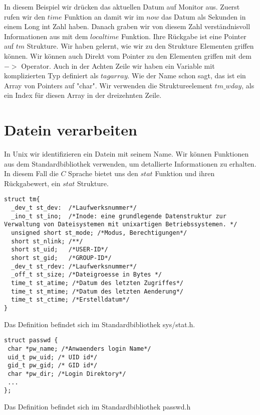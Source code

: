 \documentclass{article}[12pt]
\newenvironment{myexampleblock}[1]{%
    \tcolorbox[beamer,%
    noparskip,breakable,
    colback=White,colframe=ForestGreen,%
    colbacklower=LimeGreen!75!White,%
    title=#1]}%
    {\endtcolorbox}
\begin{document}
In diesem Beispiel wir drücken das aktuellen Datum auf Monitor aus. Zuerst rufen wir den $time$ Funktion
an damit wir  im $now$ das Datum als Sekunden in einem Long int Zahl haben. Danach graben wir von diesem Zahl 
verständnisvoll Informationen aus mit dem $localtime$ Funktion. Ihre Rückgabe ist eine Pointer auf $tm$ Strukture. 
Wir haben gelernt, wie wir zu den Strukture Elementen griffen können. Wir können auch Direkt vom Pointer
zu den Elementen griffen mit dem $->$ Operator. Auch in der Achten Zeile wir haben ein Variable mit komplizierten
Typ definiert als $tagarray$. Wie der Name schon sagt, das ist ein Array von Pointers auf "char". Wir verwenden
die Struktureelement $tm\_wday$, als ein Index für diesen Array in der dreizehnten Zeile.
\section{Datein verarbeiten}
In Unix wir identifizieren ein Datein mit seinem Name. Wir können Funktionen aus dem Standardbibliothek verwenden, um
detallierte Informationen zu erhalten. In diesem Fall die $C$ Sprache bietet uns den $stat$ Funktion und ihren Rückgabewert,
ein $stat$ Strukture. 
\begin{myexampleblock}{Definition: \texttt{struct stat}}
\begin{lstlisting}
struct tm{
  _dev_t st_dev:  /*Laufwerksnummer*/
  _ino_t st_ino;  /*Inode: eine grundlegende Datenstruktur zur Verwaltung von Dateisystemen mit unixartigen Betriebssystemen. */
  unsigned short st_mode; /*Modus, Berechtigungen*/
  short st_nlink; /**/
  short st_uid;   /*USER-ID*/
  short st_gid;   /*GROUP-ID*/
  _dev_t st_rdev: /*Laufwerksnummer*/
  _off_t st_size; /*Dateigroesse in Bytes */
  time_t st_atime; /*Datum des letzten Zugriffes*/
  time_t st_mtime; /*Datum des letzten Aenderung*/
  time_t st_ctime; /*Erstelldatum*/
}
\end{lstlisting}
\vspace{-0.4cm}
Das Definition befindet sich im Standardbibliothek sys/stat.h.
\end{myexampleblock}
\begin{myexampleblock}{Definition: \texttt{struct passwd}}
\begin{lstlisting}
struct passwd {
 char *pw_name; /*Anwaenders login Name*/
 uid_t pw_uid; /* UID id*/
 gid_t pw_gid; /* GID id*/
 char *pw_dir; /*Login Direktory*/
 ...
}; 
\end{lstlisting}
\vspace{-0.4cm}
Das Definition befindet sich im Standardbibliothek passwd.h
\end{myexampleblock}
\end{document}
